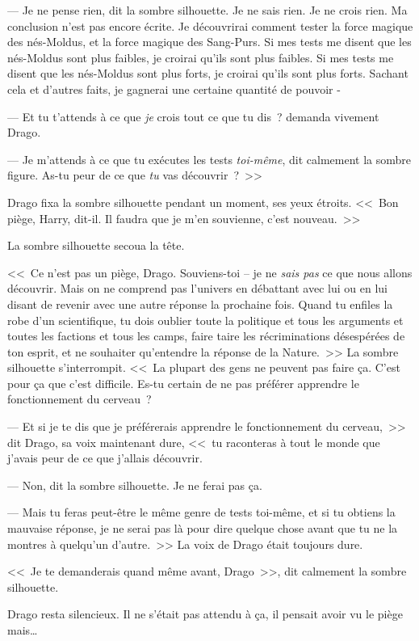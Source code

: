 --- Je ne pense rien, dit la sombre silhouette. Je ne sais rien. Je ne crois rien. Ma conclusion n'est pas encore écrite. Je découvrirai comment tester la force magique des nés-Moldus, et la force magique des Sang-Purs. Si mes tests me disent que les nés-Moldus sont plus faibles, je croirai qu'ils sont plus faibles. Si mes tests me disent que les nés-Moldus sont plus forts, je croirai qu'ils sont plus forts. Sachant cela et d'autres faits, je gagnerai une certaine quantité de pouvoir -

--- Et tu t'attends à ce que \emph{je} crois tout ce que tu dis~? demanda vivement Drago.

--- Je m'attends à ce que tu exécutes les tests \emph{toi-même}, dit calmement la sombre figure. As-tu peur de ce que \emph{tu} vas découvrir~?~>>

Drago fixa la sombre silhouette pendant un moment, ses yeux étroits. <<~Bon piège, Harry, dit-il. Il faudra que je m'en souvienne, c'est nouveau.~>>

La sombre silhouette secoua la tête.

<<~Ce n'est pas un piège, Drago. Souviens-toi -- je ne \emph{sais pas} ce que nous allons découvrir. Mais on ne comprend pas l'univers en débattant avec lui ou en lui disant de revenir avec une autre réponse la prochaine fois. Quand tu enfiles la robe d'un scientifique, tu dois oublier toute la politique et tous les arguments et toutes les factions et tous les camps, faire taire les récriminations désespérées de ton esprit, et ne souhaiter qu'entendre la réponse de la Nature.~>> La sombre silhouette s'interrompit. <<~La plupart des gens ne peuvent pas faire ça. C'est pour ça que c'est difficile. Es-tu certain de ne pas préférer apprendre le fonctionnement du cerveau~?

--- Et si je te dis que je préférerais apprendre le fonctionnement du cerveau,~>> dit Drago, sa voix maintenant dure, <<~tu raconteras à tout le monde que j'avais peur de ce que j'allais découvrir.

--- Non, dit la sombre silhouette. Je ne ferai pas ça.

--- Mais tu feras peut-être le même genre de tests toi-même, et si tu obtiens la mauvaise réponse, je ne serai pas là pour dire quelque chose avant que tu ne la montres à quelqu'un d'autre.~>> La voix de Drago était toujours dure.

<<~Je te demanderais quand même avant, Drago~>>, dit calmement la sombre silhouette.

Drago resta silencieux. Il ne s'était pas attendu à ça, il pensait avoir vu le piège mais…

